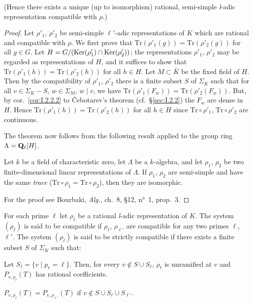 (Hence there exists a unique (up to isomorphism) rational, semi-simple
\textit{l}-adic representation compatible with $\rho$.)

\begin{proof}
Let $\rho'_1$, $\rho'_2$ be semi-simple $\ell'$-adic representations
of $K$ which are rational and compatible with $\rho$.  We first prove
that $\mathrm{Tr}(\rho'_1(g)) = \mathrm{Tr}(\rho'_2(g))$ for all
$g \in G$.  Let $H = G/(\mathrm{Ker}(\rho'_1) \cap \mathrm{Ker}(\rho'_2))$; the
representations $\rho'_1$, $\rho'_2$ may be regarded as
representations of $H$, and it suffices to show that
$\mathrm{Tr}(\rho'_1(h)) = \mathrm{Tr}(\rho'_2(h))$ for all $h \in H$.
Let $M \subset \bar{K}$ be the fixed field of $H$.  Then by the
compatibility of $\rho'_1$, $\rho'_2$ there is a finite subset $S$ of
$\Sigma_K$ such that for all $v \in \Sigma_K - S$, $w \in \Sigma_M$,
$w \mid v$, we have
$\mathrm{Tr}(\rho'_1(F_w)) = \mathrm{Tr}(\rho'_2(F_w))$.  But, by
cor.~\ref{cor:I.2.2.2} to \v{C}ebotarev's theorem
(cf.~\S\ref{sec:I.2.2}) the $F_w$ are dense in $H$.  Hence
$\mathrm{Tr}(\rho'_1(h)) = \mathrm{Tr}(\rho'_2(h))$ for all $h \in H$
since $\mathrm{Tr}\circ\rho'_1$, $\mathrm{Tr}\circ\rho'_2$ are
continuous.

The theorem now follows from the following result applied to the
group ring $\Lambda = \mathbf{Q}_\ell[H]$.

\begin{lemma}
Let $k$ be a field of characteristic zero, let $\Lambda$ be a
$k$-algebra, and let $\rho_1$, $\rho_2$ be two finite-dimensional
linear representations of $\Lambda$.  If $\rho_1$, $\rho_2$ are
semi-simple and have the same \emph{trace}
($\mathrm{Tr}\circ\rho_1 = \mathrm{Tr}\circ\rho_2$), then they are
isomorphic.
\end{lemma}

For the proof see Bourbaki, \emph{Alg.}, ch.~8, \S12, n°~1, prop.~3.
\end{proof}

\begin{dfn}
For each prime $\ell$ let $\rho_\ell$ be a rational \textit{l}-adic
representation of $K$.  The system $(\rho_\ell)$ is said to be
compatible if $\rho_\ell$, $\rho_{\ell'}$ are compatible for any two
primes $\ell$, $\ell'$.  The system $(\rho_\ell)$ is said to be
strictly compatible if there exists a finite subset $S$ of $\Sigma_K$
such that:
\begin{alist}
\item Let $S_\ell = \{v \mid p_v = \ell\}$.  Then, for every
$v \notin S \cup S_\ell$, $\rho_\ell$ is unramified at $v$ and
$P_{v,\rho_\ell}(T)$ has rational coefficients.
\item $P_{v,\rho_\ell}(T) = P_{v,\rho_{\ell'}}(T)$ if
$v \notin S \cup S_\ell \cup S_{\ell'}$.
\end{alist}
\end{dfn}

